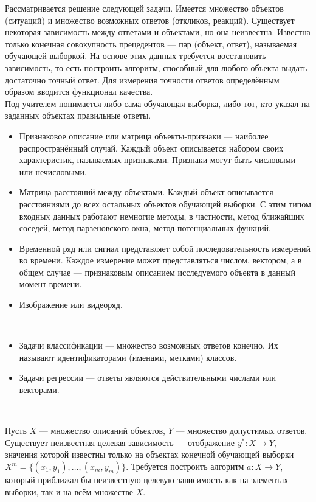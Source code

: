 Рассматривается решение следующей задачи. Имеется множество объектов (ситуаций) и множество возможных ответов (откликов, реакций). Существует некоторая зависимость между ответами и объектами, но она неизвестна. Известна только конечная совокупность прецедентов — пар (объект, ответ), называемая обучающей выборкой. На основе этих данных требуется восстановить зависимость, то есть построить алгоритм, способный для любого объекта выдать достаточно точный ответ. Для измерения точности ответов определённым образом вводится функционал качества. \\

Под учителем понимается либо сама обучающая выборка, либо тот, кто указал на заданных объектах правильные ответы. \\

\begin{itemize}
  \item Признаковое описание или матрица объекты-признаки — наиболее распространённый случай. Каждый объект описывается набором своих характеристик, называемых признаками. Признаки могут быть числовыми или нечисловыми.
  \item Матрица расстояний между объектами. Каждый объект описывается расстояниями до всех остальных объектов обучающей выборки. С этим типом входных данных работают немногие методы, в частности, метод ближайших соседей, метод парзеновского окна, метод потенциальных функций.
  \item Временной ряд или сигнал представляет собой последовательность измерений во времени. Каждое измерение может представляться числом, вектором, а в общем случае — признаковым описанием исследуемого объекта в данный момент времени.
  \item Изображение или видеоряд.
\end{itemize}
\

\begin{itemize}
  \item Задачи классификации — множество возможных ответов конечно. Их называют идентификаторами (именами, метками) классов.
  \item Задачи регрессии — ответы являются действительными числами или векторами.
\end{itemize}
\

Пусть $X$ — множество описаний объектов, $Y$ — множество допустимых ответов. Существует неизвестная целевая зависимость — отображение $y^{*}: X \to Y$, значения которой известны только на объектах конечной обучающей выборки $X^m = \{(x_1, y_1), \dots, (x_m, y_m)\}$. Требуется построить алгоритм $a: X \to Y$, который приближал бы неизвестную целевую зависимость как на элементах выборки, так и на всём множестве $X$. \\

